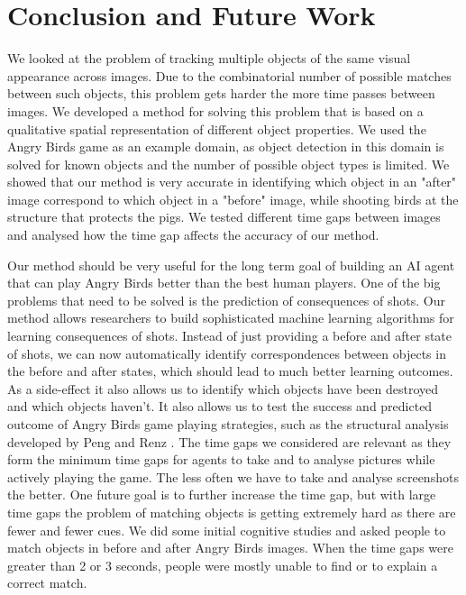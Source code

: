\documentclass[letterpaper]{article}
\begin{document}
\section{Conclusion and Future Work}

We looked at the problem of tracking multiple objects of the same visual appearance across images. Due to the combinatorial number of possible matches between such objects, this problem gets harder the more time passes between images. We developed a method for solving this problem that is based on a qualitative spatial representation of different object properties. We used the Angry Birds game as an example domain, as object detection in this domain is solved for known objects and the number of possible object types is limited. We showed that our method is very accurate in identifying which object in an "after" image correspond to which object in a "before" image, while shooting birds at the structure that protects the pigs. We tested different time gaps between images and analysed how the time gap affects the accuracy of our method. 

Our method should be very useful for the long term goal of building an AI agent that can play Angry Birds better than the best human players. One of the big problems that need to be solved is the prediction of consequences of shots. Our method allows researchers to build sophisticated machine learning algorithms for learning consequences of shots. Instead of just providing a before and after state of shots, we can now automatically identify correspondences between objects in the before and after states, which should lead to much better learning outcomes. As a side-effect it also allows us to identify which objects have been destroyed and which objects haven't. 
It also allows us to test the success and predicted outcome of Angry Birds game playing strategies, such as the structural analysis developed by Peng and Renz \cite{peng13}. 
The time gaps we considered are relevant as they form the minimum time gaps for agents to take and to analyse pictures while actively playing the game. The less often we have to take and analyse screenshots the better. One future goal is to further increase the time gap, but with large time gaps the problem of matching objects is getting extremely hard as there are fewer and fewer cues. We did some initial cognitive studies and asked people to match objects in before and after Angry Birds images. When the time gaps were greater than 2 or 3 seconds, people were mostly unable to find or to explain a correct match. 
\end{document}
